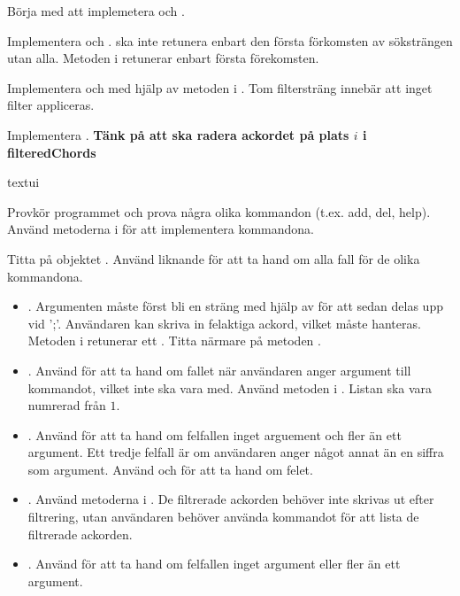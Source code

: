 {\Subtask Börja med att implemetera  och .

\Subtask Implementera  och .  ska inte retunera enbart den första förkomsten av söksträngen utan alla. Metoden  i  retunerar enbart första förekomsten.

\Subtask Implementera  och  med hjälp av metoden  i . Tom filtersträng innebär att inget filter appliceras.

\Subtask Implementera . \textbf{Tänk på att  ska radera ackordet på plats $i$ i filteredChords}

\Task textui

\Subtask Provkör programmet och prova några olika kommandon (t.ex. add, del, help). Använd metoderna i  för att implementera kommandona.

\Subtask Titta på objektet . Använd liknande  för att ta hand om alla fall för de olika kommandona.

\begin{itemize}
\item {}. Argumenten måste först bli en sträng med hjälp av  för att sedan delas upp vid ';'. Användaren kan skriva in felaktiga ackord, vilket måste hanteras. Metoden  i  retunerar ett . Titta närmare på metoden .

\item {}. Använd  för att ta hand om fallet när användaren anger argument till kommandot, vilket inte ska vara med. Använd metoden i . Listan ska vara numrerad från $1$.

\item {}. Använd  för att ta hand om felfallen inget arguement och fler än ett argument. Ett tredje felfall är om användaren anger något annat än en siffra som argument. Använd  och  för att ta hand om felet.

\item {}. Använd metoderna i . De filtrerade ackorden behöver inte skrivas ut efter filtrering, utan användaren behöver använda kommandot  för att lista de filtrerade ackorden.

\item {}. Använd  för att ta hand om felfallen inget argument eller fler än ett argument.


\end{itemize}}
